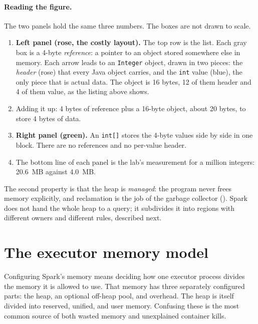 \paragraph{Reading the figure.} The two panels hold the same three numbers. The boxes are not drawn
to scale.
\begin{enumerate}[nosep]
\item \textbf{Left panel (rose, the costly layout).} The top row is the list. Each
      gray box is a 4-byte \emph{reference}: a pointer to an object stored somewhere
      else in memory. Each arrow leads to an \texttt{Integer} object, drawn in two
      pieces: the \emph{header} (rose) that every Java object carries, and the
      \texttt{int} value (blue), the only piece that is actual data. The object is
      16 bytes, 12 of them header and 4 of them value, as the listing above shows.
\item Adding it up: 4 bytes of reference plus a 16-byte object, about 20 bytes, to
      store 4 bytes of data.
\item \textbf{Right panel (green).} An \texttt{int[]} stores the 4-byte values
      side by side in one block. There are no references and no per-value header.
\item The bottom line of each panel is the lab's measurement for a million
      integers: 20.6~MB against 4.0~MB.
\end{enumerate}


The second property is that the heap is \emph{managed}: the program never frees
memory explicitly, and reclamation is the job of the garbage collector
(). Spark does not hand the whole heap to a query; it subdivides
it into regions with different owners and different rules, described next.

\section{The executor memory model}
\label{sec:mem-model}

Configuring Spark's memory means deciding how one executor process divides the
memory it is allowed to use. That memory has three separately configured
parts: the heap, an optional off-heap pool, and overhead. The heap is itself
divided into reserved, unified, and user memory. Confusing these is the most
common source of both wasted memory and unexplained container kills.

